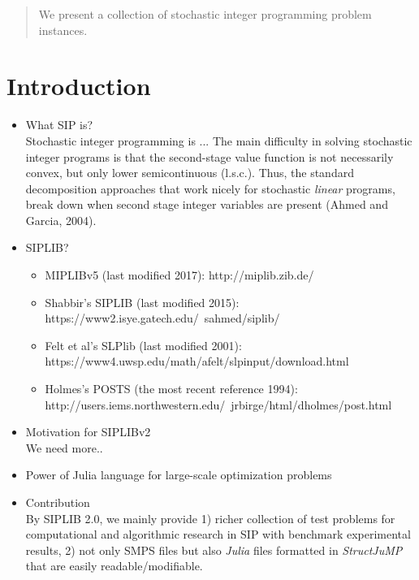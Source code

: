 \date{Received: date / Accepted: date}


\maketitle

\begin{abstract}
We present a collection of stochastic integer programming problem instances.
\end{abstract}

\section{Introduction}
\begin{itemize}
	\item What SIP is?\\
	Stochastic integer programming is ... The main difficulty in solving stochastic integer programs is that the second-stage value function is not necessarily convex, but only lower semicontinuous (l.s.c.). Thus, the standard decomposition approaches that work nicely for stochastic \textit{linear} programs, break down when second stage integer variables are present (Ahmed and Garcia, 2004). 
	\item SIPLIB?\\
	\begin{itemize}
		\item MIPLIBv5 (last modified 2017): http://miplib.zib.de/
		\item Shabbir's SIPLIB (last modified 2015): https://www2.isye.gatech.edu/~sahmed/siplib/
		\item Felt et al's SLPlib (last modified 2001): https://www4.uwsp.edu/math/afelt/slpinput/download.html
		\item Holmes's POSTS (the most recent reference 1994): http://users.iems.northwestern.edu/~jrbirge/html/dholmes/post.html
	\end{itemize}
	\item Motivation for SIPLIBv2\\
	We need more..
	\item Power of Julia language for large-scale optimization problems
	\item Contribution\\
	By SIPLIB 2.0, we mainly provide 1) richer collection of test problems for computational and algorithmic research in SIP with benchmark experimental results, 2) not only SMPS files but also \textit{Julia} files formatted in \textit{StructJuMP} that are easily readable/modifiable.
\end{itemize}


